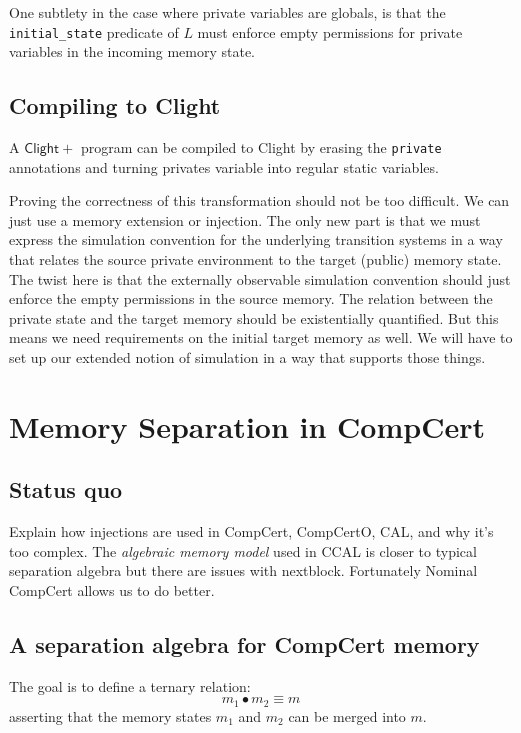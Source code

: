 \documentclass[acmsmall,screen,review,anonymous]{acmart}
\newcommand{\ClightP}{\ensuremath{\mathsf{Clight+}}}
\begin{document}
One subtlety in the case where private variables are globals,
is that the \texttt{initial\_state} predicate of $L$
must enforce empty permissions for private variables
in the incoming memory state.

\subsection{Compiling to Clight}

A \ClightP{} program can be compiled to Clight
by erasing the \texttt{private} annotations
and turning privates variable into regular
static variables.

Proving the correctness of this transformation
should not be too difficult.
We can just use a memory extension or injection.
The only new part is that we must express
the simulation convention for the underlying transition systems
in a way that relates the source private environment
to the target (public) memory state.
The twist here is that
the externally observable simulation convention
should just enforce the empty permissions in the source memory.
The relation between the private state and the target memory
should be existentially quantified.
But this means we need requirements on the initial target memory as well.
We will have to set up our extended notion of simulation
in a way that supports those things.


\section{Memory Separation in CompCert} %

\subsection{Status quo} %

Explain how injections are used in CompCert, CompCertO, CAL,
and why it's too complex.
The \emph{algebraic memory model} used in CCAL
is closer to typical separation algebra
but there are issues with nextblock.
Fortunately Nominal CompCert allows us to
do better.


\subsection{A separation algebra for CompCert memory} %

The goal is to define a ternary relation:
\[
    m_1 \bullet m_2 \equiv m
\]
asserting that the memory states $m_1$ and $m_2$
can be merged into $m$.
\end{document}
